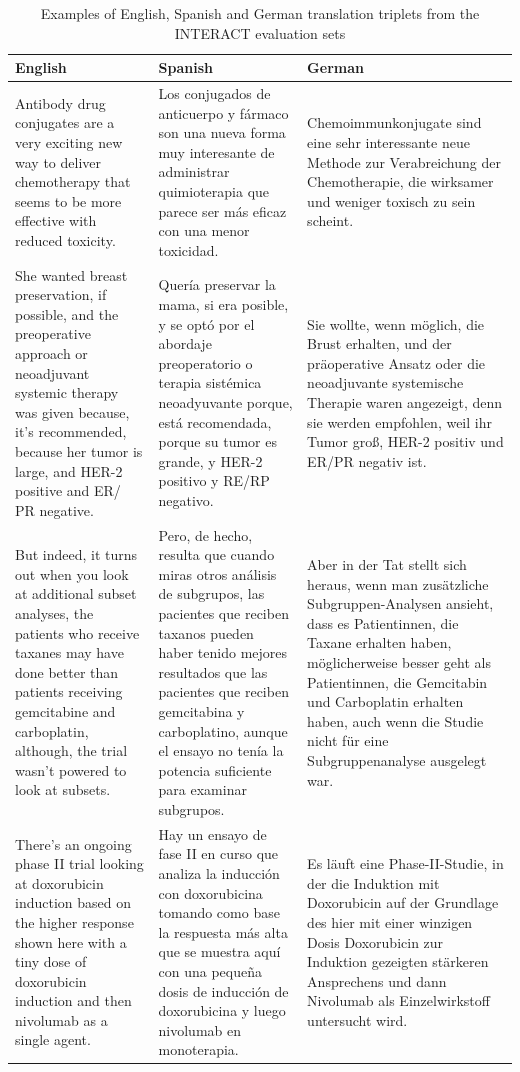 \documentclass[11pt,english,listoffigures,listoftables]{tfgetsinf}
\begin{document}
\begin{table}[]
    \centering
    \caption{Examples of English, Spanish and German translation triplets from the INTERACT evaluation sets}
    \label{tab:examples_test_interact}
    \begin{tabular}{p{5cm} | p{5cm} | p{5cm}}
         English & Spanish & German \\
         \hline \hline
         Antibody drug conjugates are a very exciting new way to deliver chemotherapy that seems to be more effective with reduced toxicity. & Los conjugados de anticuerpo y fármaco son una nueva forma muy interesante de administrar quimioterapia que parece ser más eficaz con una menor toxicidad. & Chemoimmunkonjugate sind eine sehr interessante neue Methode zur Verabreichung der Chemotherapie, die wirksamer und weniger toxisch zu sein scheint. \\
         \hline
         She wanted breast preservation, if possible, and the preoperative approach or neoadjuvant systemic therapy was given because, it's recommended, because her tumor is large, and HER-2 positive and ER/ PR negative. & Quería preservar la mama, si era posible, y se optó por el abordaje preoperatorio o terapia sistémica neoadyuvante porque, está recomendada, porque su tumor es grande, y HER-2 positivo y RE/RP negativo. & Sie wollte, wenn möglich, die Brust erhalten, und der präoperative Ansatz oder die neoadjuvante systemische Therapie waren angezeigt, denn sie werden empfohlen, weil ihr Tumor groß, HER-2 positiv und ER/PR negativ ist. \\
         \hline
         But indeed, it turns out when you look at additional subset analyses, the patients who receive taxanes may have done better than patients receiving gemcitabine and carboplatin, although, the trial wasn't powered to look at subsets. & Pero, de hecho, resulta que cuando miras otros análisis de subgrupos, las pacientes que reciben taxanos pueden haber tenido mejores resultados que las pacientes que reciben gemcitabina y carboplatino, aunque el ensayo no tenía la potencia suficiente para examinar subgrupos. & Aber in der Tat stellt sich heraus, wenn man zusätzliche Subgruppen-Analysen ansieht, dass es Patientinnen, die Taxane erhalten haben, möglicherweise besser geht als Patientinnen, die Gemcitabin und Carboplatin erhalten haben, auch wenn die Studie nicht für eine Subgruppenanalyse ausgelegt war. \\
         \hline
         There's an ongoing phase II trial looking at doxorubicin induction based on the higher response shown here with a tiny dose of doxorubicin induction and then nivolumab as a single agent. & Hay un ensayo de fase II en curso que analiza la inducción con doxorubicina tomando como base la respuesta más alta que se muestra aquí con una pequeña dosis de inducción de doxorubicina y luego nivolumab en monoterapia. & Es läuft eine Phase-II-Studie, in der die Induktion mit Doxorubicin auf der Grundlage des hier mit einer winzigen Dosis Doxorubicin zur Induktion gezeigten stärkeren Ansprechens und dann Nivolumab als Einzelwirkstoff untersucht wird. \\

\end{tabular}
\end{table}
\end{document}
